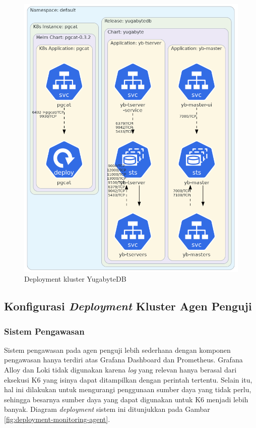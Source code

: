 \begin{figure}[htbp]
    \centering
    \includegraphics[width=1\textwidth]{resources/chapter-4/yugabyte.png}
    \caption{Deployment kluster YugabyteDB}
    \label{fig:deployment-yugabyte}
\end{figure}

\pagebreak

\subsection{Konfigurasi \textit{Deployment} Kluster Agen Penguji}

\subsubsection{Sistem Pengawasan}

Sistem pengawasan pada agen penguji lebih sederhana dengan komponen pengawasan hanya terdiri atas Grafana Dashboard dan Prometheus. Grafana Alloy dan Loki tidak digunakan karena \textit{log} yang relevan hanya berasal dari eksekusi K6 yang isinya dapat ditampilkan dengan perintah tertentu. Selain itu, hal ini dilakukan untuk mengurangi penggunaan sumber daya yang tidak perlu, sehingga besarnya sumber daya yang dapat digunakan untuk K6 menjadi lebih banyak. Diagram \textit{deployment} sistem ini ditunjukkan pada Gambar \ref{fig:deployment-monitoring-agent}.

